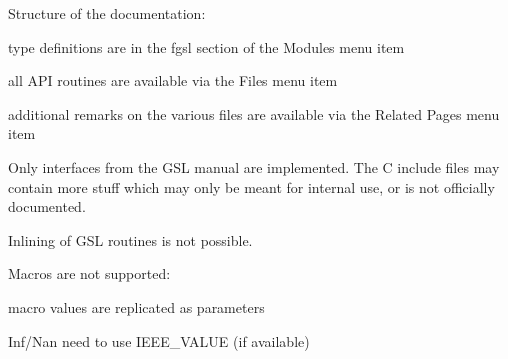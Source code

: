 \begin{DoxyEnumerate}
\begin{DoxyItemize}
\end{DoxyItemize}
\item Structure of the documentation\-: 
\begin{DoxyItemize}
\item type definitions are in the fgsl section of the Modules menu item 
\item all A\-P\-I routines are available via the Files menu item 
\item additional remarks on the various files are available via the Related Pages menu item 
\end{DoxyItemize}
\item Only interfaces from the G\-S\-L manual are implemented. The C include files may contain more stuff which may only be meant for internal use, or is not officially documented. 
\item Inlining of G\-S\-L routines is not possible. 
\item Macros are not supported\-: 
\begin{DoxyItemize}
\item macro values are replicated as parameters 
\item Inf/\-Nan need to use I\-E\-E\-E\-\_\-\-V\-A\-L\-U\-E (if available) 
\end{DoxyItemize}
\end{DoxyEnumerate}